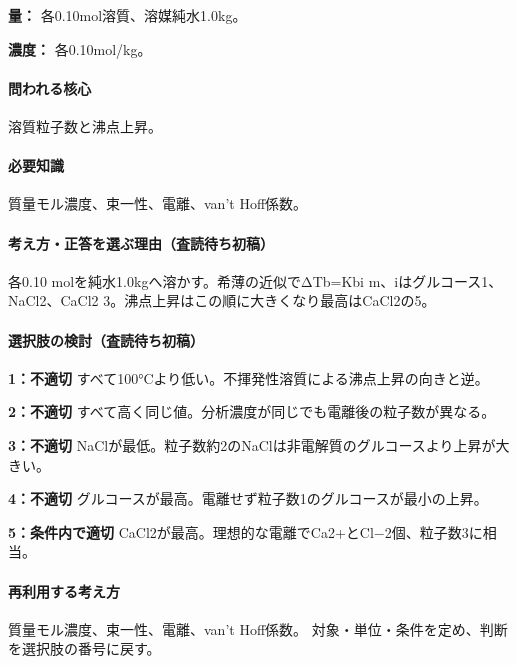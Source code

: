 \noindent\textbf{量：} 各0.10mol溶質、溶媒純水1.0kg。\par

\noindent\textbf{濃度：} 各0.10mol/kg。\par

\paragraph{問われる核心} 溶質粒子数と沸点上昇。

\paragraph{必要知識} 質量モル濃度、束一性、電離、van’t Hoff係数。

\paragraph{考え方・正答を選ぶ理由（査読待ち初稿）} 各0.10 molを純水1.0kgへ溶かす。希薄の近似でΔTb=\allowbreak{}Kbi m、iはグルコース1、NaCl2、CaCl2 3。沸点上昇はこの順に大きくなり最高はCaCl2の5。

\paragraph{選択肢の検討（査読待ち初稿）}\mbox{}\par

\noindent\textbf{1：不適切} すべて100°Cより低い。不揮発性溶質による沸点上昇の向きと逆。\par

\noindent\textbf{2：不適切} すべて高く同じ値。分析濃度が同じでも電離後の粒子数が異なる。\par

\noindent\textbf{3：不適切} NaClが最低。粒子数約2のNaClは非電解質のグルコースより上昇が大きい。\par

\noindent\textbf{4：不適切} グルコースが最高。電離せず粒子数1のグルコースが最小の上昇。\par

\noindent\textbf{5：条件内で適切} CaCl2が最高。理想的な電離でCa2+とCl−2個、粒子数3に相当。\par

\paragraph{再利用する考え方} 質量モル濃度、束一性、電離、van’t Hoff係数。 対象・単位・条件を定め、判断を選択肢の番号に戻す。

